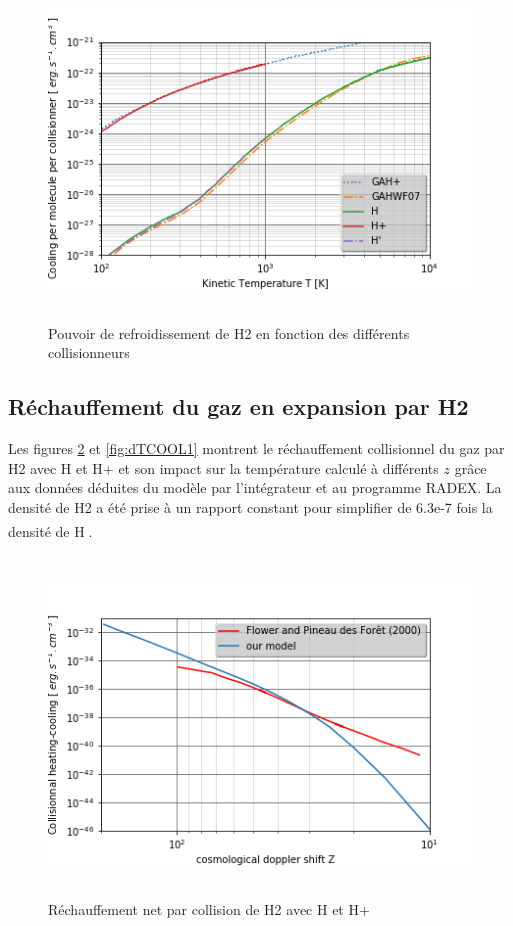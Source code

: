 \documentclass[10pt, a4paper]{report}
\numberwithin{equation}{subsection}
\begin{document}
\begin{figure}[]
\centering
\includegraphics[width=14.0cm,height=9cm]{CPfinal.png}
\caption{Pouvoir de refroidissement de H2 en fonction des différents collisionneurs}
\label{fig:CPfinal}
\end{figure}

\subsection{Réchauffement du gaz en expansion par H2}
Les figures \ref{fig:ZCOOL1} et  \ref{fig:dTCOOL1} montrent le réchauffement collisionnel du gaz par H2 avec H et H+ et son impact sur la température calculé à différents $z$ grâce aux données déduites du modèle par l'intégrateur et au programme RADEX. La densité de H2 a été prise à un rapport constant pour simplifier de 6.3e-7 fois la densité de H\textsuperscript{\cite{Galli} \cite{Flower}}.   
\begin{figure}[]
\centering
\includegraphics[width=14.0cm,height=9cm]{Zcoolfinal.png}
\caption{Réchauffement net par collision de H2 avec H et H+}
\label{fig:ZCOOL1}
\end{figure}
\end{document}
